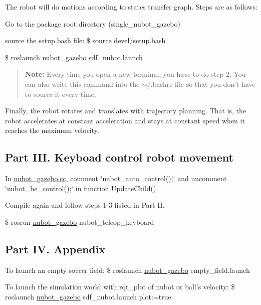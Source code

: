The robot will do motions according to states transfer graph. Steps are as follows\-:
\begin{DoxyEnumerate}
\item Go to the package root directory (single\-\_\-nubot\-\_\-gazebo)
\item source the setup.\-bash file\-: {\ttfamily \$ source devel/setup.\-bash}
\item {\ttfamily \$ roslaunch \hyperlink{namespacenubot__gazebo}{nubot\-\_\-gazebo} sdf\-\_\-nubot.\-launch}
\end{DoxyEnumerate}

\begin{quotation}
{\bfseries Note\-:} Every time you open a new terminal, you have to do step 2. You can also write this command into the $\sim$/.bashrc file so that you don't have to source it every time.

\end{quotation}


Finally, the robot rotates and translates with trajectory planning. That is, the robot accelerates at constant acceleration and stays at constant speed when it reaches the maximum velocity.

\subsection*{Part I\-I\-I. Keyboad control robot movement}


\begin{DoxyEnumerate}
\item In \hyperlink{nubot__gazebo_8cc}{nubot\-\_\-gazebo.\-cc}, comment \char`\"{}nubot\-\_\-auto\-\_\-control();\char`\"{} and uncomment \char`\"{}nubot\-\_\-be\-\_\-control();\char`\"{} in function Update\-Child().
\item Compile again and follow steps 1-\/3 listed in Part I\-I.
\item {\ttfamily \$ rosrun \hyperlink{namespacenubot__gazebo}{nubot\-\_\-gazebo} nubot\-\_\-teleop\-\_\-keyboard}
\end{DoxyEnumerate}

\subsection*{Part I\-V. Appendix}


\begin{DoxyEnumerate}
\item To launch an empty soccer field\-: {\ttfamily \$ roslaunch \hyperlink{namespacenubot__gazebo}{nubot\-\_\-gazebo} empty\-\_\-field.\-launch}
\item To launch the simulation world with rqt\-\_\-plot of nubot or ball's velocity\-: {\ttfamily \$ roslaunch \hyperlink{namespacenubot__gazebo}{nubot\-\_\-gazebo} sdf\-\_\-nubot.\-launch plot\-:=true}
\end{DoxyEnumerate}

